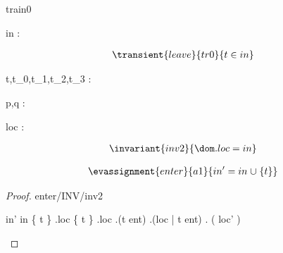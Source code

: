 \documentclass[12pt]{amsart}
\title{}
\author{}
\date{} %
\begin{document}
\maketitle
\tableofcontents


\begin{machine}{train0}


%
	\begin{variable}
		in : \set[\TRAIN]
	\end{variable}
%



\begin{align*}
\transient{leave}{tr0}
{	t \in in}
\end{align*}

\begin{dummy}
	t,t_0,t_1,t_2,t_3 : \TRAIN
\end{dummy}

\begin{dummy}
	p,q : \BLK
\end{dummy}


\begin{variable}
	loc : \TRAIN \pfun \BLK
\end{variable}

\begin{align*}
\invariant{inv2}
{	\dom . loc = in }
\end{align*}

\begin{align*}
\evassignment{enter}{a1}
{	in' = in \bunion \{ t \} }
\end{align*}

\begin{proof}{enter/INV/inv2}
	\begin{calculation}
		in'
	\hint{=}{ \ref{a1} }
		in \bunion \{ t \}
	\hint{=}{ \ref{inv2} }
		\dom.loc \bunion \{ t \}
		\dom.loc \bunion \dom.(t \tfun ent)
		\dom.(loc   |   t \tfun ent)
	\hint{=}{ \ref{a2} }
		\dom. ( loc' )
	\end{calculation}
\end{proof}


\end{machine}
\end{document}
